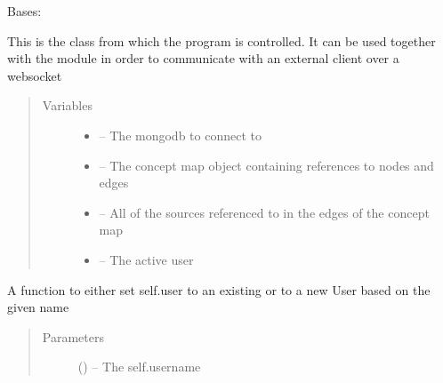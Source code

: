 \documentclass[letterpaper,10pt,english]{sphinxmanual}
\begin{document}
\begin{fulllineitems}
\label{\detokenize{controller:controller.Controller}}
Bases: \href{https://docs.python.org/2/library/functions.html\#object}{}

This is the class from which the program is controlled. It can be used together with the {\hyperref[\detokenize{handler:module-handler}]{}} module in order to communicate with an external client over a websocket
\begin{quote}\begin{description}
\item[{Variables}] \leavevmode\begin{itemize}
\item {} 
 -- The mongodb to connect to

\item {} 
{\hyperref[\detokenize{concept_map:module-concept_map}]{}} -- The concept map object containing references to nodes and edges

\item {} 
 -- All of the sources referenced to in the edges of the concept map

\item {} 
{\hyperref[\detokenize{user:module-user}]{}} -- The active user

\end{itemize}

\end{description}\end{quote}

\begin{fulllineitems}
\label{\detokenize{controller:controller.Controller.authenticate}}
A function to either set self.user to an existing {\hyperref[\detokenize{user:user.User}]{}} or to a new User based on the given name
\begin{quote}\begin{description}
\item[{Parameters}] \leavevmode
{} (\href{https://docs.python.org/2/library/functions.html\#str}{}) -- The self.username


\end{description}
\end{quote}
\end{fulllineitems}
\end{fulllineitems}
\end{document}
